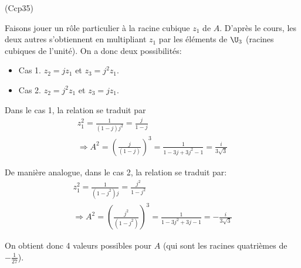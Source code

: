 \begin{tiny}(Ccp35)\end{tiny}
Faisons jouer un rôle particulier à la racine cubique $z_1$ de $A$. D'après le cours, les deux autres s'obtiennent en multipliant $z_1$ par les éléments de $\U_3$ (racines cubiques de l'unité). On a donc deux possibilités:
\begin{itemize}
  \item Cas 1. $z_2 = jz_1$ et $z_3=j^2z_1$.
  \item Cas 2. $z_2 = j^2z_1$ et $z_3=jz_1$.
\end{itemize}
Dans le cas 1, la relation se traduit par 
\begin{multline*}
  z_1^2 = \frac{1}{(1-j)j^2}=\frac{j}{1-j}\\
  \Rightarrow
  A^2 = \left(\frac{j}{(1-j)} \right)^3 = \frac{1}{1-3j+3j^2-1}=\frac{i}{3\sqrt{3}}
\end{multline*}

De manière analogue, dans le cas 2, la relation se traduit par:
\begin{multline*}
  z_1^2 = \frac{1}{(1-j^2)j}=\frac{j^2}{1-j^2} \\
  \Rightarrow
  A^2 = \left(\frac{j^2}{(1-j^2)} \right)^3 = \frac{1}{1-3j^2+3j-1}=-\frac{i}{3\sqrt{3}}
\end{multline*}

On obtient donc 4 valeurs possibles pour $A$ (qui sont les racines quatrièmes de $-\frac{1}{27}$).
